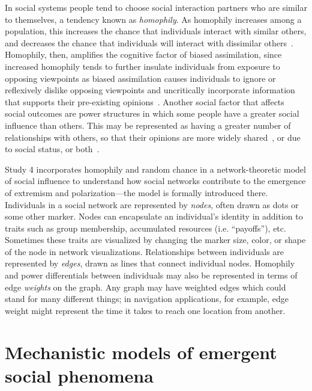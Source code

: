 \documentclass[12pt,letterpaper]{article}
\begin{document}
In social systems people tend to choose social interaction partners who 
are similar to themselves, a tendency known as \emph{homophily}. As homophily
increases among a population, this
increases the chance that individuals interact with similar others, 
and decreases the chance that individuals will interact with dissimilar
others~\cite{McPherson2001}. Homophily, then, amplifies the cognitive factor of biased assimilation,
since increased homophily tends to further insulate individuals from
exposure to opposing viewpoints as biased assimilation causes individuals to 
ignore or reflexively dislike opposing viewpoints and uncritically incorporate
information that supports their pre-existing opinions~\cite{Mark2003,Dandekar2013}.
Another social factor that affects social outcomes are power structures
in which some people have a greater social influence than others.
This may be represented as having a greater number of relationships
with others, so that their opinions are more widely shared~\cite{French1956,Friedkin1986},
or due to social status, or both~\cite{DeGroot1974}.

Study 4 incorporates homophily and random chance in a network-theoretic
model of social influence to understand how social networks contribute to
the emergence of extremism and polarization---the model is formally 
introduced there. Individuals in a social network are represented by \emph{nodes},
often drawn as dots or some other marker. Nodes can encapsulate an individual's
identity in addition to traits such as group
membership, accumulated resources (i.e. ``payoffs''), etc. Sometimes these traits are visualized
by changing the marker size, color, or shape of the node in network visualizations.  Relationships
between individuals are represented by \emph{edges}, drawn as lines that connect
individual nodes.  Homophily and power differentials between individuals 
may also be represented in terms of edge \emph{weights} on the graph. Any graph
may have weighted edges which could stand for many different things; in
navigation applications, for example, edge weight might represent the time it takes to reach 
one location from another. 

\section{Mechanistic models of emergent social phenomena}
\end{document}
